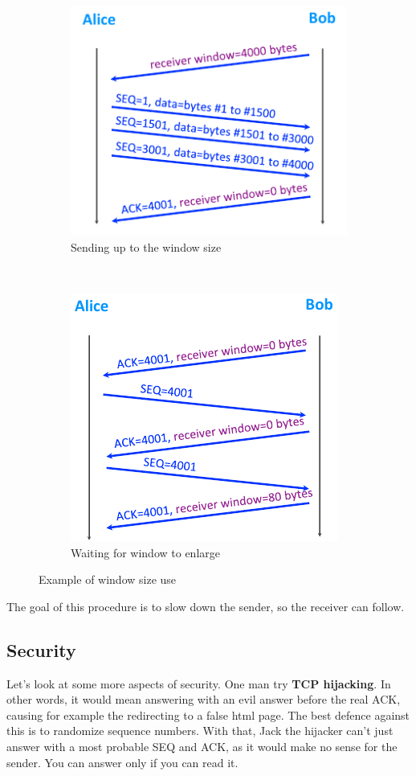 \documentclass[12pt,a4paper]{article}
\begin{document}
\begin{figure}
	\centering
	\begin{subfigure}[b]{0.45\textwidth}
		\centering
		\includegraphics[scale=0.8]{images/window_ok}
		\caption{Sending up to the window size}
		\label{subfig : receiver window ok}
	\end{subfigure}
	~
	\begin{subfigure}[b]{0.45\textwidth}
		\centering
		\includegraphics[scale=0.8]{images/window_full}
		\caption{Waiting for window to enlarge}
		\label{subfig : receiver window full}
	\end{subfigure}
	\caption{Example of window size use}
	\label{figs: window size}
\end{figure}

The goal of this procedure is to slow down the sender, so the receiver can follow.

\subsection{Security}
Let's look at some more aspects of security. One man try \textbf{TCP hijacking}. In other words, it would mean answering with an evil answer before the real ACK, causing for example the redirecting to a false html page. The best defence against this is to randomize sequence numbers. With that, Jack the hijacker can't just answer with a most probable SEQ and ACK, as it would make no sense for the sender. You can answer only if you can read it.
\end{document}
